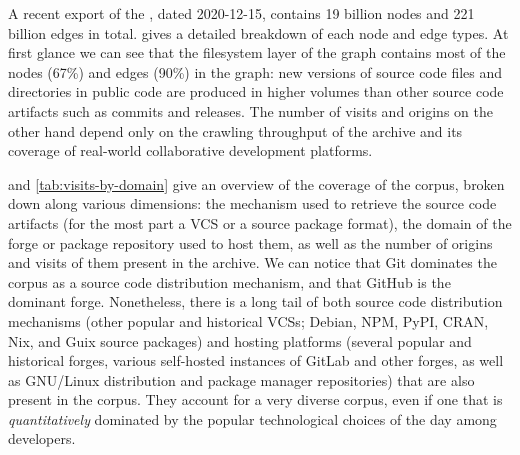 A recent export of the \SWHGD{}, dated 2020-12-15, contains 19 billion nodes
and 221 billion edges in total.
 gives a detailed breakdown of each node and edge
types. At first glance we can see that the filesystem layer of the graph
contains most of the nodes (67\%) and edges (90\%) in the graph: new versions
of source code files and directories in public code are produced in higher
volumes than other source code artifacts such as commits and releases. The
number of visits and origins on the other hand depend only on the crawling
throughput of the \SWH{} archive and its coverage of real-world collaborative
development platforms.

 and \cref{tab:visits-by-domain} give an overview
of the coverage of the corpus, broken down along various dimensions:
the mechanism used to retrieve the source code artifacts (for the most part a
VCS or a source package format), the domain of the forge or package repository
used to host them, as well as the number of origins and visits of them present
in the archive.  We can notice that Git dominates the corpus as a source code
distribution mechanism, and that GitHub is the dominant forge.  Nonetheless,
there is a long tail of both source code distribution mechanisms (other popular
and historical VCSs; Debian, NPM, PyPI, CRAN, Nix, and Guix source packages)
and hosting platforms (several popular and historical forges, various
self-hosted instances of GitLab and other forges, as well as GNU/Linux
distribution and package manager repositories) that are also present in the
corpus. They account for a very diverse corpus, even if one that is
\emph{quantitatively} dominated by the popular technological choices of the day
among developers.

